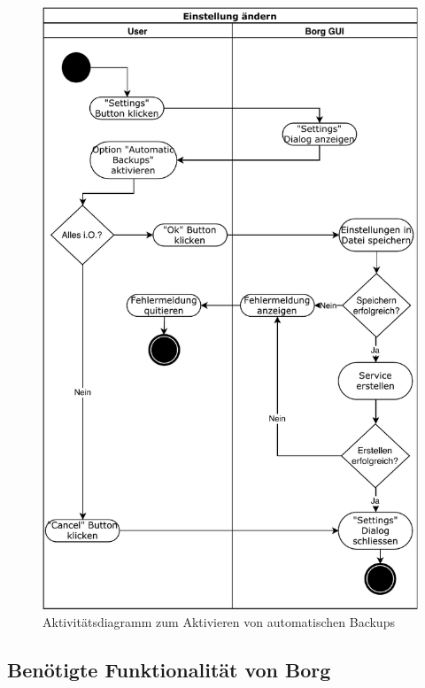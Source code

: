 \begin{figure}[htbp]
\centering
\includegraphics[width=.9\linewidth]{pictures/activity_automatic.pdf}
\caption{\label{fig:orge73dce1}
Aktivitätsdiagramm zum Aktivieren von automatischen Backups}
\end{figure}
\newpage

\subsection{Benötigte Funktionalität von Borg}
\label{sec:orgc8db247}


